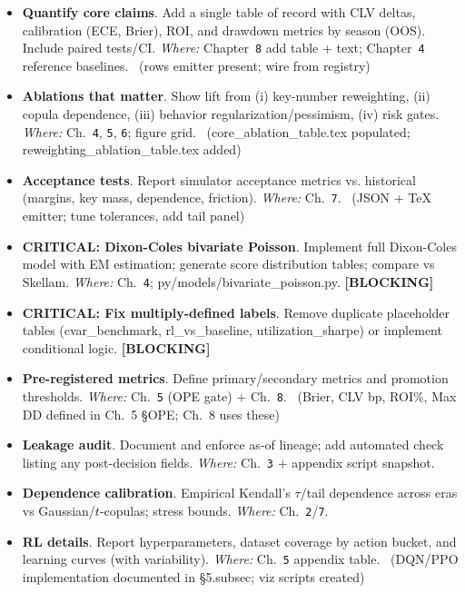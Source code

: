 \begin{itemize}
  \item {} \textbf{Quantify core claims}. Add a single table of record with CLV deltas, calibration (ECE, Brier), ROI, and drawdown metrics by season (OOS). Include paired tests/CI. \emph{Where:} Chapter~\texttt{8} add table + text; Chapter~\texttt{4} reference baselines. \done\ (rows emitter present; wire from registry)
  \item {} \textbf{Ablations that matter}. Show lift from (i) key-number reweighting, (ii) copula dependence, (iii) behavior regularization/pessimism, (iv) risk gates. \emph{Where:} Ch.~\texttt{4}, \texttt{5}, \texttt{6}; figure grid. \done\ (core\_ablation\_table.tex populated; reweighting\_ablation\_table.tex added)
  \item {} \textbf{Acceptance tests}. Report simulator acceptance metrics vs. historical (margins, key mass, dependence, friction). \emph{Where:} Ch.~\texttt{7}. \done\ (JSON + TeX emitter; tune tolerances, add tail panel)
  \item {} \textbf{CRITICAL: Dixon-Coles bivariate Poisson}. Implement full Dixon-Coles model with EM estimation; generate score distribution tables; compare vs Skellam. \emph{Where:} Ch.~\texttt{4}; py/models/bivariate\_poisson.py. \textbf{[BLOCKING]}
  \item {} \textbf{CRITICAL: Fix multiply-defined labels}. Remove duplicate placeholder tables (cvar\_benchmark, rl\_vs\_baseline, utilization\_sharpe) or implement conditional logic. \textbf{[BLOCKING]}
\end{itemize}

\begin{itemize}
  \item {} \textbf{Pre-registered metrics}. Define primary/secondary metrics and promotion thresholds. \emph{Where:} Ch.~\texttt{5} (OPE gate) + Ch.~\texttt{8}. \done\ (Brier, CLV bp, ROI\%, Max DD defined in Ch.~5 \S OPE; Ch.~8 uses these)
  \item {} \textbf{Leakage audit}. Document and enforce as-of lineage; add automated check listing any post-decision fields. \emph{Where:} Ch.~\texttt{3} + appendix script snapshot. \wip
\end{itemize}

\begin{itemize}
  \item {} \textbf{Dependence calibration}. Empirical Kendall’s $\tau$/tail dependence across eras vs Gaussian/$t$-copulas; stress bounds. \emph{Where:} Ch.~\texttt{2}/\texttt{7}.
  \item {} \textbf{RL details}. Report hyperparameters, dataset coverage by action bucket, and learning curves (with variability). \emph{Where:} Ch.~\texttt{5} appendix table. \done\ (DQN/PPO implementation documented in \S5.subsec; viz scripts created)
\end{itemize}

